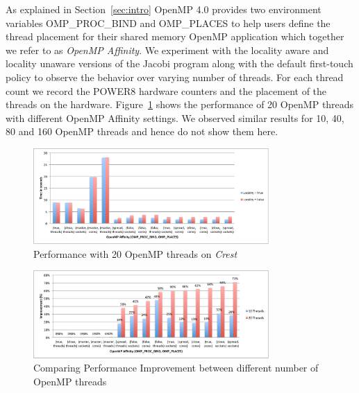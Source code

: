 As explained in Section~\ref{sec:intro} OpenMP 4.0 provides two environment variables OMP\_PROC\_BIND and OMP\_PLACES to help users define the thread placement for their shared memory OpenMP application which together we refer to as \textit{OpenMP Affinity}.%
%
 We experiment with the locality aware and locality unaware versions of the Jacobi program along with the default first-touch policy to observe the behavior over varying number of threads. 
 For each thread count we record the POWER8 hardware counters and the placement of the threads on the hardware. 
 Figure~\ref{fig:20th} shows the performance of 20 OpenMP threads with different OpenMP Affinity settings. We observed similar results for 10, 40, 80 and 160 OpenMP threads and hence do not show them here.
%
\begin{figure}[h!]
  \centering
  \includegraphics[height=0.4\textwidth, width=0.8\textwidth]{./Images/20Perf.pdf}
       \caption{Performance with 20 OpenMP threads on \textit{Crest}}
       \label{fig:20th}
\end{figure}
%
\begin{figure}[h!]
  \centering
  \includegraphics[height=0.4\textwidth, width=0.8\textwidth]{./Images/PerfI.pdf}
       \caption{Comparing Performance Improvement between different number of OpenMP threads}
       \label{fig:imp}
\end{figure}
